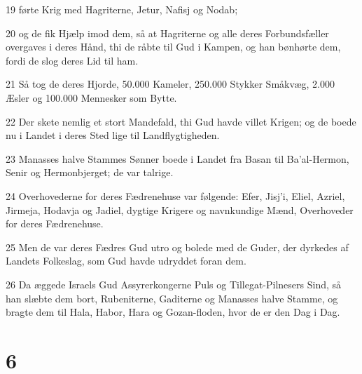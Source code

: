 \par 19 førte Krig med Hagriterne, Jetur, Nafisj og Nodab;
\par 20 og de fik Hjælp imod dem, så at Hagriterne og alle deres Forbundsfæller overgaves i deres Hånd, thi de råbte til Gud i Kampen, og han bønhørte dem, fordi de slog deres Lid til ham.
\par 21 Så tog de deres Hjorde, 50.000 Kameler, 250.000 Stykker Småkvæg, 2.000 Æsler og 100.000 Mennesker som Bytte.
\par 22 Der skete nemlig et stort Mandefald, thi Gud havde villet Krigen; og de boede nu i Landet i deres Sted lige til Landflygtigheden.
\par 23 Manasses halve Stammes Sønner boede i Landet fra Basan til Ba'al-Hermon, Senir og Hermonbjerget; de var talrige.
\par 24 Overhovederne for deres Fædrenehuse var følgende: Efer, Jisj'i, Eliel, Azriel, Jirmeja, Hodavja og Jadiel, dygtige Krigere og navnkundige Mænd, Overhoveder for deres Fædrenehuse.
\par 25 Men de var deres Fædres Gud utro og bolede med de Guder, der dyrkedes af Landets Folkeslag, som Gud havde udryddet foran dem.
\par 26 Da æggede Israels Gud Assyrerkongerne Puls og Tillegat-Pilnesers Sind, så han slæbte dem bort, Rubeniterne, Gaditerne og Manasses halve Stamme, og bragte dem til Hala, Habor, Hara og Gozan-floden, hvor de er den Dag i Dag.

\chapter{6}

